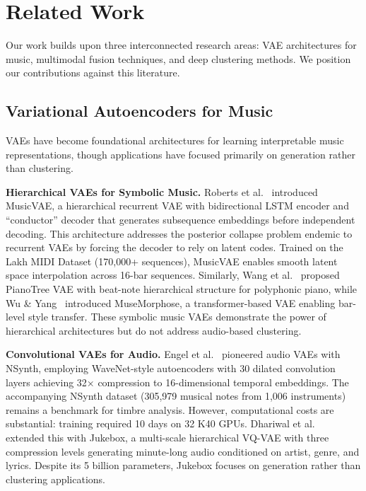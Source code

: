 \documentclass[10pt,twocolumn]{article}
\begin{document}
\section{Related Work}
\label{sec:related}

Our work builds upon three interconnected research areas: VAE architectures for music, multimodal fusion techniques, and deep clustering methods. We position our contributions against this literature.

\subsection{Variational Autoencoders for Music}

VAEs have become foundational architectures for learning interpretable music representations, though applications have focused primarily on generation rather than clustering.

\textbf{Hierarchical VAEs for Symbolic Music.} Roberts et al.~\cite{roberts2018hierarchical} introduced MusicVAE, a hierarchical recurrent VAE with bidirectional LSTM encoder and ``conductor'' decoder that generates subsequence embeddings before independent decoding. This architecture addresses the posterior collapse problem endemic to recurrent VAEs by forcing the decoder to rely on latent codes. Trained on the Lakh MIDI Dataset (170,000+ sequences), MusicVAE enables smooth latent space interpolation across 16-bar sequences. Similarly, Wang et al.~\cite{wang2020pianotree} proposed PianoTree VAE with beat-note hierarchical structure for polyphonic piano, while Wu \& Yang~\cite{wu2021musemorphose} introduced MuseMorphose, a transformer-based VAE enabling bar-level style transfer. These symbolic music VAEs demonstrate the power of hierarchical architectures but do not address audio-based clustering.

\textbf{Convolutional VAEs for Audio.} Engel et al.~\cite{engel2017neural} pioneered audio VAEs with NSynth, employing WaveNet-style autoencoders with 30 dilated convolution layers achieving 32× compression to 16-dimensional temporal embeddings. The accompanying NSynth dataset (305,979 musical notes from 1,006 instruments) remains a benchmark for timbre analysis. However, computational costs are substantial: training required 10 days on 32 K40 GPUs. Dhariwal et al.~\cite{dhariwal2020jukebox} extended this with Jukebox, a multi-scale hierarchical VQ-VAE with three compression levels generating minute-long audio conditioned on artist, genre, and lyrics. Despite its 5 billion parameters, Jukebox focuses on generation rather than clustering applications.
\end{document}
